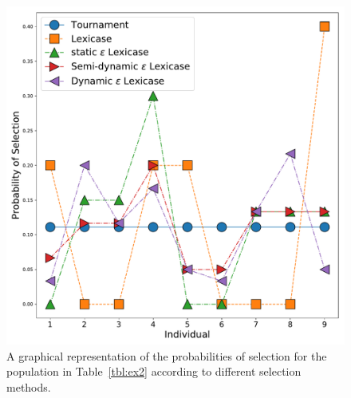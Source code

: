 \documentclass[twoside]{article}
\begin{document}
\begin{figure}
\centering
  \includegraphics[height = 0.4\textheight]{figs/probabilities.pdf}
  \caption{A graphical representation of the probabilities of selection for the population in Table~\ref{tbl:ex2} according to different selection methods.}\label{fig:prob}
\end{figure}
\end{document}
